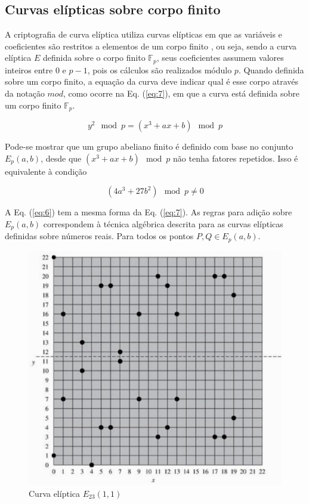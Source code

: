 %
%
\subsection{Curvas elípticas sobre corpo finito}
A criptografia de curva elíptica utiliza curvas elípticas em que as variáveis e coeficientes são restritos a elementos de um corpo finito \cite{Stallings:2011}, ou seja, sendo a curva elíptica $E$ definida sobre o corpo finito $\mathbb{F}_p$, seus coeficientes assumem valores inteiros entre 0 e $p - 1$, pois os cálculos são realizados módulo \(p\). Quando definida sobre um corpo finito, a equação da curva deve indicar qual é esse corpo através da notação $mod$, como ocorre na Eq. (\ref{eq:7}), em que a curva está definida sobre um corpo finito $\mathbb{F}_p$.

\begin{equation}
y^2 \mod p = (x^3 + ax + b) \mod p \label{eq:7}
\end{equation}

Pode-se mostrar que um grupo abeliano finito é definido com base no conjunto $E_p(a, b)$, desde que $(x^3 + ax + b) \mod p$ não tenha fatores repetidos. Isso é equivalente à condição

\begin{equation}
(4a^3 + 27b^2) \mod p \neq 0
\end{equation}

A Eq. (\ref{eq:6}) tem a mesma forma da Eq. (\ref{eq:7}). As regras para adição sobre $E_p(a, b)$ correspondem à técnica algébrica descrita para as curvas elípticas definidas sobre números reais. Para todos os pontos $P, Q \in E_p(a, b)$.

\begin{figure}[h]
\centering
\includegraphics[scale=0.6, bb=0 0 515 478]{figuras/curva_sobre_corpo_finito.eps}
\caption{Curva elíptica $E_{23}(1, 1)$}
\label{fig:curva_exemplo}
\end{figure}

